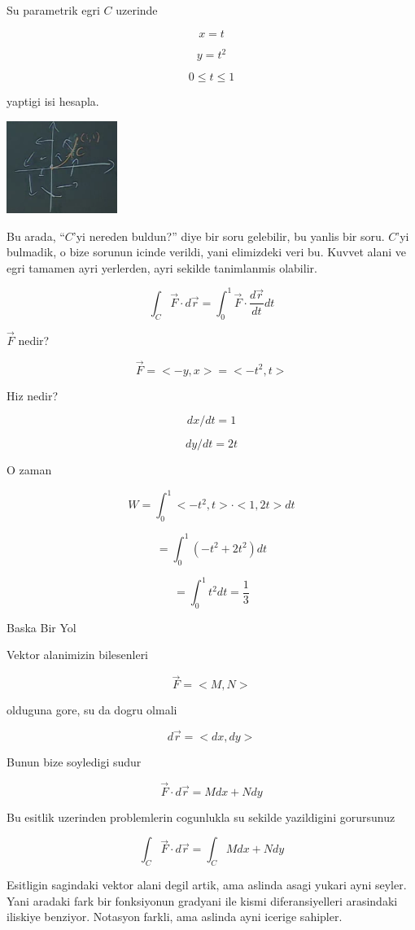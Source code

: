 \documentclass[12pt,fleqn]{article}
\begin{document}
Su parametrik egri $C$ uzerinde

\[ x = t  \]

\[ y = t^2 \]

\[ 0 \le t \le 1 \]

yaptigi isi hesapla. 

\includegraphics[height=3cm]{19_10.png}

Bu arada, ``$C$'yi nereden buldun?'' diye bir soru gelebilir, bu yanlis bir
soru. $C$'yi bulmadik, o bize sorunun icinde verildi, yani elimizdeki veri
bu. Kuvvet alani ve egri tamamen ayri yerlerden, ayri sekilde tanimlanmis
olabilir. 

\[ \int_C \vec{F} \cdot d\vec{r} 
= \int_{0}^{1} \vec{F} \cdot \frac{d\vec{r}}{dt} dt 
\]

$\vec{F}$ nedir? 

\[ \vec{F} = <-y,x> = <-t^2,t> \]

Hiz nedir? 

\[ dx/dt = 1 \]

\[ dy/dt = 2t \]

O zaman 

\[ W = \int_{0}^{1}  <-t^2,t>\cdot<1,2t>dt \]

\[ = \int_{0}^{1} (-t^2 + 2t^2)dt\]

\[ = \int_{0}^{1} t^2dt = \frac{1}{3} \]


Baska Bir Yol

Vektor alanimizin bilesenleri

\[ \vec{F} = <M,N> \]

olduguna gore, su da dogru olmali

\[ d\vec{r} = <dx, dy> \]

Bunun bize soyledigi sudur

\[  \vec{F} \cdot d\vec{r}  = M dx + N dy
\]

Bu esitlik uzerinden problemlerin cogunlukla su sekilde yazildigini
gorursunuz

\[  \int_C \vec{F} \cdot d\vec{r}  = \int_C M dx + N dy\]

Esitligin sagindaki vektor alani degil artik, ama aslinda asagi yukari ayni
seyler. Yani aradaki fark bir fonksiyonun gradyani ile kismi
diferansiyelleri arasindaki iliskiye benziyor. Notasyon farkli, ama aslinda
ayni icerige sahipler. 
\end{document}
